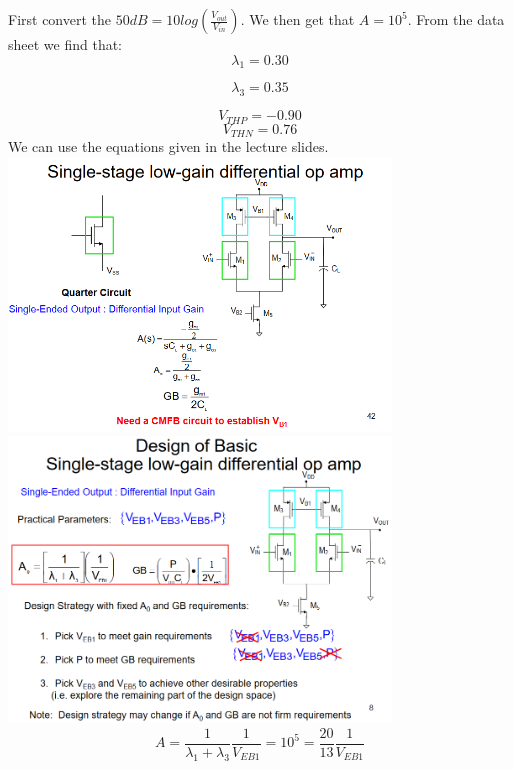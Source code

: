 \documentclass[10pt,a4paper]{article}
\begin{document}
First convert the $50dB = 10 log(\frac{V_{out}}{V_{in}})$. We then get that $A = 10^5$.
From the data sheet we find that:
\begin{equation}
\lambda_1 = 0.30
\end{equation}

\begin{equation}
\lambda_3 = 0.35
\end{equation}

\begin{equation}
V_{THP} = -0.90
\end{equation}
\begin{equation}
V_{THN} = 0.76
\end{equation}
We can use the equations given in the lecture slides.\\
\includegraphics[width=4in]{images/5TOpamp.png} \\
\includegraphics[width=4in]{images/5TOpampPractical.png} \\
\begin{equation}
A = \frac{1}{\lambda_1 + \lambda_3} \frac{1}{V_{EB1}} = 10^5 = \frac{20}{13}\frac{1}{V_{EB1}} 
\end{equation}
\end{document}
